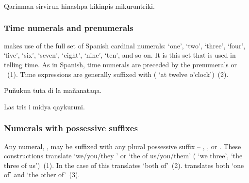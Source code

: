 {%
{Qarinman sirvirun  hinashpa kikinpis mikuruntriki.}%
{}%
{}{}%

\subsubsection{Time numerals and prenumerals}\label{ssec:timenum}
\SYQ{} makes use of the full set of Spanish cardinal numerals:  `one',  `two',  `three',  `four',  `five',  `six',  `seven',  `eight',  `nine',  `ten', and so on. It is this set that is used in telling time. As in Spanish, time numerals are preceded by the prenumerals  or ~(1). Time expressions are generally suffixed with  ( `at twelve o'clock')~(2).

%
{Pu\~nukun tuta  di la ma\~nanataqa.}%
{}%
{}{}%

%
{Las tris i midya qaykuruni.}%
{}%
{}{}%

\subsubsection{Numerals with possessive suffixes}\label{ssec:numallaff}
Any numeral, , may be suffixed with any plural possessive suffix -- , , or . These constructions translate `we/you/they ' or `the  of us/you/them' ( `we three', `the three of us')~(1). In the case of  this translates `both of'~(2).  translates both `one of' and `the other of'~(3).

}
